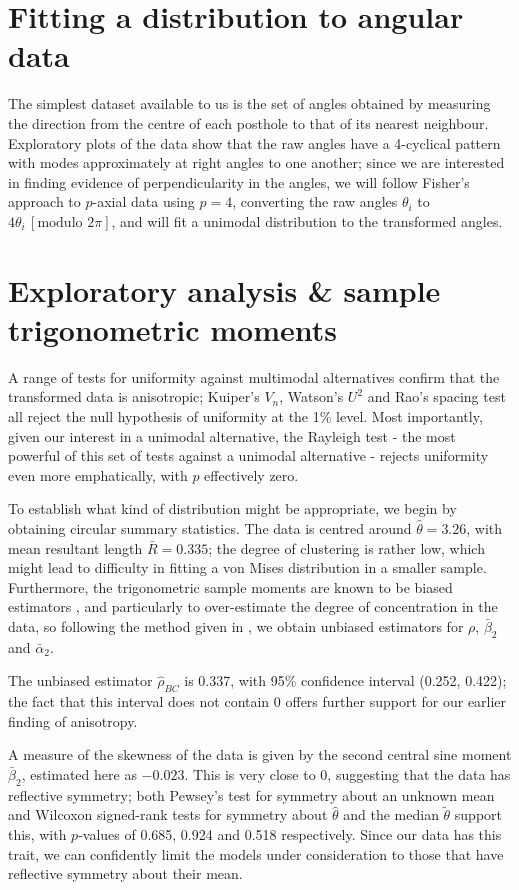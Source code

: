 \documentclass[12pt,fleqn]{article} %
\begin{document}
\section*{Fitting a distribution to angular data}
The simplest dataset available to us is the set of angles obtained by measuring the direction from the centre of each posthole  to that of its nearest neighbour. Exploratory plots of the data show that the raw angles have a 4-cyclical pattern with modes approximately at right angles to one another; since we are interested in finding evidence of perpendicularity in the angles, we will follow Fisher's approach to $p$-axial data \cite{Fisher1993} using $p=4$, converting the raw angles $\theta_i$ to $4\theta_i \, \left[\text{modulo } 2\pi \right]$, and will fit a unimodal distribution to the transformed angles.

\section{Exploratory analysis \& sample trigonometric moments}
A range of tests for uniformity against multimodal alternatives confirm that the transformed data is anisotropic; Kuiper's $V_n$, Watson's $U^2$ and Rao's spacing test all reject the null  hypothesis of uniformity at the 1\% level. Most importantly, given our interest in a unimodal alternative, the Rayleigh test - the most powerful of this set of tests against a unimodal alternative - rejects uniformity even more emphatically, with $p$ effectively zero. 

To establish what kind of distribution might be appropriate, we begin by obtaining circular summary statistics. The data is centred around $\hat{\theta} = 3.26$, with mean resultant length $\bar{R} = 0.335$; the degree of clustering is rather low, which might lead to difficulty in fitting a von Mises distribution in a smaller sample. Furthermore, the trigonometric sample moments are known to be biased estimators \cite{Pewsey2004}, and particularly to over-estimate the degree of concentration in the data, so following the method given in \cite{Pewsey2014}, we obtain unbiased estimators for $\rho$, $\bar{\beta}_2$ and $\bar{\alpha}_2$. 

The unbiased estimator $\hat{\rho}_{BC}$ is 0.337, with 95\% confidence interval (0.252, 0.422); the fact that this interval does not contain 0 offers further support for our earlier finding of anisotropy.

A measure of the skewness of the data is given by the second central sine moment ${\bar{\beta}_2}$, estimated here as $-0.023$. This is very close to 0, suggesting that the data has reflective symmetry; both Pewsey's test for symmetry about an unknown mean \cite{Pewsey2002} and Wilcoxon signed-rank tests for symmetry about $\hat{\theta}$ and the median $\tilde{\theta}$ support this, with $p$-values of 0.685, 0.924 and 0.518 respectively. Since our data has this trait, we can confidently limit the models under consideration to those that have reflective symmetry about their mean.
\end{document}
